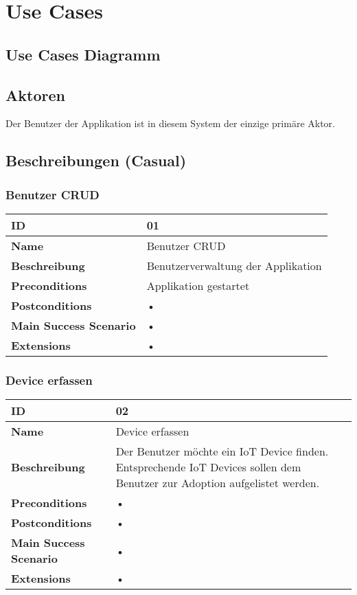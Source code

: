 \section{Use Cases}
\subsection{Use Cases Diagramm}
\subsection{Aktoren}
Der Benutzer der Applikation ist in diesem System der einzige primäre Aktor.
\subsection{Beschreibungen (Casual)}
\subsubsection{Benutzer CRUD}
\mbox{}
\begin{longtable}{| p{4cm} | p{11.7cm} |}
 \hline
 \textbf{ID} & 01\\ \hline 
 \textbf{Name} & Benutzer CRUD\\ \hline 
 \textbf{Beschreibung} & Benutzerverwaltung der Applikation\\ \hline 
 \textbf{Preconditions} & Applikation gestartet\\ \hline 
 \textbf{Postconditions} & • \\ \hline 
 \textbf{Main Success Scenario} & • \\ \hline 
 \textbf{Extensions} & • \\ \hline 
 \end{longtable}

\subsubsection{Device erfassen}
\mbox{}
\begin{longtable}{| p{4cm} | p{11.7cm} |}
 \hline
 \textbf{ID} & 02\\ \hline 
 \textbf{Name} & Device erfassen \\ \hline 
 \textbf{Beschreibung} & Der Benutzer möchte ein IoT Device finden. Entsprechende IoT Devices sollen dem Benutzer zur Adoption aufgelistet werden. \\ \hline 
 \textbf{Preconditions} & • \\ \hline 
 \textbf{Postconditions} & • \\ \hline 
 \textbf{Main Success Scenario} & • \\ \hline 
 \textbf{Extensions} & • \\ \hline 
\end{longtable}

